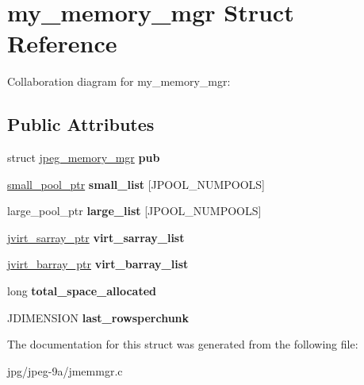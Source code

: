\hypertarget{structmy__memory__mgr}{\section{my\+\_\+memory\+\_\+mgr Struct Reference}
\label{structmy__memory__mgr}
}


Collaboration diagram for my\+\_\+memory\+\_\+mgr\+:
\subsection*{Public Attributes}
\begin{DoxyCompactItemize}
\item 
\hypertarget{structmy__memory__mgr_a692dd77bfba8ab81c4f42643254d4528}{struct \hyperlink{structjpeg__memory__mgr}{jpeg\+\_\+memory\+\_\+mgr} {\bfseries pub}}\label{structmy__memory__mgr_a692dd77bfba8ab81c4f42643254d4528}

\item 
\hypertarget{structmy__memory__mgr_a1c2bfaa346643520a2ff682c38e4ce0d}{\hyperlink{unionsmall__pool__struct}{small\+\_\+pool\+\_\+ptr} {\bfseries small\+\_\+list} \mbox{[}J\+P\+O\+O\+L\+\_\+\+N\+U\+M\+P\+O\+O\+L\+S\mbox{]}}\label{structmy__memory__mgr_a1c2bfaa346643520a2ff682c38e4ce0d}

\item 
\hypertarget{structmy__memory__mgr_af8257908eac43538230773374417739b}{large\+\_\+pool\+\_\+ptr {\bfseries large\+\_\+list} \mbox{[}J\+P\+O\+O\+L\+\_\+\+N\+U\+M\+P\+O\+O\+L\+S\mbox{]}}\label{structmy__memory__mgr_af8257908eac43538230773374417739b}

\item 
\hypertarget{structmy__memory__mgr_ad613a2a2e52ac069c63fd083c9c91f04}{\hyperlink{structjvirt__sarray__control}{jvirt\+\_\+sarray\+\_\+ptr} {\bfseries virt\+\_\+sarray\+\_\+list}}\label{structmy__memory__mgr_ad613a2a2e52ac069c63fd083c9c91f04}

\item 
\hypertarget{structmy__memory__mgr_a09b8c66f15f14f1c3c247d98d6c81bbc}{\hyperlink{structjvirt__barray__control}{jvirt\+\_\+barray\+\_\+ptr} {\bfseries virt\+\_\+barray\+\_\+list}}\label{structmy__memory__mgr_a09b8c66f15f14f1c3c247d98d6c81bbc}

\item 
\hypertarget{structmy__memory__mgr_acfcdee3e2d3e3d168e2a2aebe081535f}{long {\bfseries total\+\_\+space\+\_\+allocated}}\label{structmy__memory__mgr_acfcdee3e2d3e3d168e2a2aebe081535f}

\item 
\hypertarget{structmy__memory__mgr_a7e30eb574b588f102f07d0ddb94d177d}{J\+D\+I\+M\+E\+N\+S\+I\+O\+N {\bfseries last\+\_\+rowsperchunk}}\label{structmy__memory__mgr_a7e30eb574b588f102f07d0ddb94d177d}

\end{DoxyCompactItemize}


The documentation for this struct was generated from the following file\+:\begin{DoxyCompactItemize}
\item 
jpg/jpeg-\/9a/jmemmgr.\+c\end{DoxyCompactItemize}
